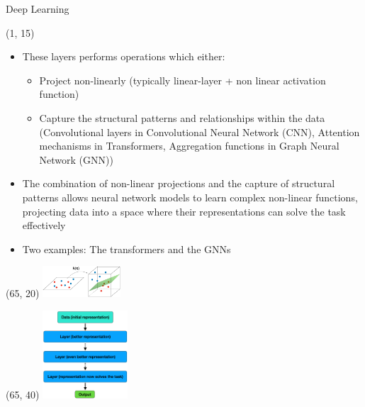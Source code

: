 \begin{frame}{Deep Learning}
  \begin{textblock}{60}(1, 15)
    \begin{itemize}
      \item These layers performs operations which either:
      \begin{itemize}
        \item Project non-linearly (typically linear-layer + non linear activation function)
        \item Capture the structural patterns and relationships within the data (Convolutional layers in Convolutional Neural Network (CNN), Attention mechanisms in Transformers, Aggregation functions in Graph Neural Network (GNN))
      \end{itemize}
      \item The combination of non-linear projections and the capture of structural patterns allows neural network models to learn complex non-linear functions, projecting data into a space where their representations can solve the task effectively
      \item Two examples: The transformers and the GNNs
    \end{itemize}
  \end{textblock}

  \begin{textblock}{40}(65, 20)
    \includegraphics[width=110px]{img/projection.png}
  \end{textblock}
  \begin{textblock}{40}(65, 40)
    \includegraphics[width=120px]{img/projection_dl.png}
  \end{textblock}

\end{frame}



